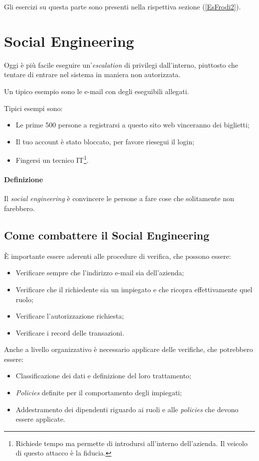 Gli esercizi su questa parte sono presenti nella rispettiva sezione
(\ref{EsFrodi2}).

\section{Social Engineering}
		
Oggi è più facile eseguire un'\textit{escalation} di privilegi dall'interno,
piuttosto che tentare di entrare nel sistema in maniera non autorizzata.

Un tipico esempio sono le e-mail con degli eseguibili allegati.

Tipici esempi sono:
\begin{itemize}
  \item Le prime 500 persone a registrarsi a questo sito web vinceranno dei
  biglietti;
  \item Il tuo account è stato bloccato, per favore riesegui il login;
  \item Fingersi un tecnico IT\footnote{Richiede tempo ma permette di
introdursi all'interno dell'azienda. Il veicolo di questo attacco è la fiducia.}.
\end{itemize}

\paragraph*{Definizione} Il \textit{social engineering} è convincere le persone
a fare cose che solitamente non farebbero.

\subsection{Come combattere il Social Engineering}

È importante essere aderenti alle procedure di verifica, che possono essere:
\begin{itemize}
  \item Verificare sempre che l'indirizzo e-mail sia dell'azienda;
  \item Verificare che il richiedente sia un impiegato e che ricopra
  effettivamente quel ruolo;
  \item Verificare l'autorizzazione richiesta;
  \item Verificare i record delle transazioni.
\end{itemize}

Anche a livello organizzativo è necessario applicare delle verifiche, che
potrebbero essere:
\begin{itemize}
  \item Classificazione dei dati e definizione del loro trattamento;
  \item \textit{Policies} definite per il comportamento degli impiegati;
  \item Addestramento dei dipendenti riguardo ai ruoli e alle \textit{policies}
che devono essere applicate.
\end{itemize}

